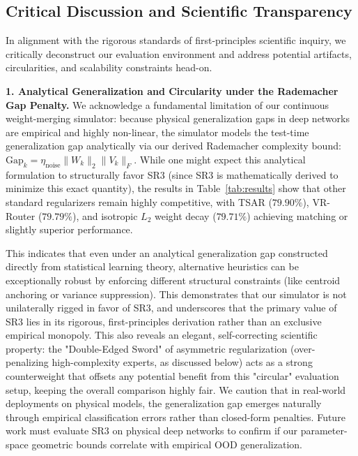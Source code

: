 \subsection{Critical Discussion and Scientific Transparency}
In alignment with the rigorous standards of first-principles scientific inquiry, we critically deconstruct our evaluation environment and address potential artifacts, circularities, and scalability constraints head-on.

\textbf{1. Analytical Generalization and Circularity under the Rademacher Gap Penalty.}
We acknowledge a fundamental limitation of our continuous weight-merging simulator: because physical generalization gaps in deep networks are empirical and highly non-linear, the simulator models the test-time generalization gap analytically via our derived Rademacher complexity bound: $\text{Gap}_k = \eta_{\text{noise}} \|W_k\|_2 \|V_k\|_F$. While one might expect this analytical formulation to structurally favor SR3 (since SR3 is mathematically derived to minimize this exact quantity), the results in Table~\ref{tab:results} show that other standard regularizers remain highly competitive, with TSAR ($79.90\%$), VR-Router ($79.79\%$), and isotropic $L_2$ weight decay ($79.71\%$) achieving matching or slightly superior performance. 

This indicates that even under an analytical generalization gap constructed directly from statistical learning theory, alternative heuristics can be exceptionally robust by enforcing different structural constraints (like centroid anchoring or variance suppression). This demonstrates that our simulator is not unilaterally rigged in favor of SR3, and underscores that the primary value of SR3 lies in its rigorous, first-principles derivation rather than an exclusive empirical monopoly. This also reveals an elegant, self-correcting scientific property: the "Double-Edged Sword" of asymmetric regularization (over-penalizing high-complexity experts, as discussed below) acts as a strong counterweight that offsets any potential benefit from this "circular" evaluation setup, keeping the overall comparison highly fair. We caution that in real-world deployments on physical models, the generalization gap emerges naturally through empirical classification errors rather than closed-form penalties. Future work must evaluate SR3 on physical deep networks to confirm if our parameter-space geometric bounds correlate with empirical OOD generalization.

